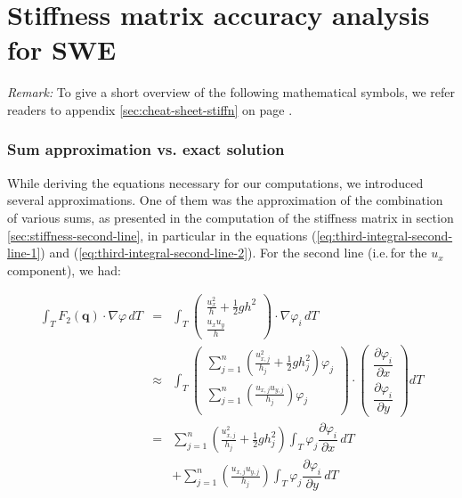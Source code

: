 \documentclass{article}
\newcommand{\pd}[2]{\dfrac{\partial #1}{\partial #2}}
\renewcommand{\phi}{\varphi}
\begin{document}
\clearpage{}

\part{Stiffness matrix accuracy analysis for SWE}
\label{part:stiffness-matrix}

\emph{Remark:} To give a short overview of the following mathematical symbols, we refer readers to appendix \ref{sec:cheat-sheet-stiffn} on page \pageref{sec:cheat-sheet-stiffn}.

\section{Sum approximation vs. exact solution}
\label{sec:point-wise-appr-vs-exact-solution-intro}

While deriving the equations necessary for our computations, we introduced several approximations. One of them was the approximation of the combination of various sums, as presented in the computation of the stiffness matrix in section \ref{sec:stiffness-second-line}, in particular in the equations (\ref{eq:third-integral-second-line-1}) and (\ref{eq:third-integral-second-line-2}). For the second line (i.e.\,for the $u_x$ component), we had:

\begin{eqnarray}
  \label{eq:third-integral-second-line-1-analysis-part}
  \int_T F_2(\mathbf{q}) \cdot \nabla \phi \, dT & = &
  \int_T
  \begin{pmatrix}
    \frac{u_x^2}{h} + \frac{1}{2} g h^2 \\ \frac{u_x u_y}{h}
  \end{pmatrix}
  \cdot \nabla \phi_i \, dT \\
  \label{eq:third-integral-second-line-2-analysis-part}
  & \approx &
  \int_T
  \begin{pmatrix}
    \sum_{j=1}^n \left(\frac{u_{x,j}^2}{h_j} + \frac{1}{2} g h_j^2\right) \phi_j \\
    \sum_{j=1}^n \left(\frac{u_{x,j} u_{y,j}}{h_j}\right) \phi_j \\
  \end{pmatrix}
  \cdot
  \begin{pmatrix}
    \pd{\phi_i}{x} \\
    \pd{\phi_i}{y}
  \end{pmatrix} dT \\
  & = & \nonumber \sum_{j=1}^n \left(\frac{u_{x,j}^2}{h_j} + \frac{1}{2} g h_j^2\right) \int_T \phi_j \pd{\phi_i}{x} \, dT \\
  & {} & + \nonumber \sum_{j=1}^n \left(\frac{u_{x,j} u_{y,j}}{h_j}\right) \int_T \phi_j \pd{\phi_i}{y} \, dT
\end{eqnarray}
\end{document}
